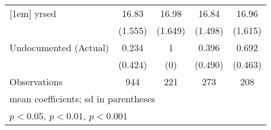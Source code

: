 \begin{table}[htbp]
\begin{tabular}{l*{4}{c}}
[1em]
yrsed               &       16.83         &       16.98         &       16.84         &       16.96         \\
                    &     (1.555)         &     (1.649)         &     (1.498)         &     (1.615)         \\
[1em]
Undocumented (Actual)&       0.234         &           1         &       0.396         &       0.692         \\
                    &     (0.424)         &         (0)         &     (0.490)         &     (0.463)         \\
\hline
Observations        &         944         &         221         &         273         &         208         \\
\hline\hline
\multicolumn{5}{l}{\footnotesize mean coefficients; sd in parentheses}\\
\multicolumn{5}{l}{\footnotesize \sym{*} \(p<0.05\), \sym{**} \(p<0.01\), \sym{***} \(p<0.001\)}\\
\end{tabular}
\end{table}
